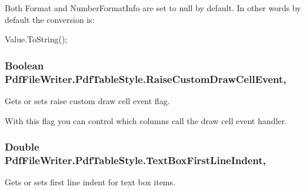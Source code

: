 Both Format and Number\+Format\+Info are set to null by default. In other words by default the conversion is\+: 


\begin{DoxyCode}
Value.ToString();
\end{DoxyCode}
\subsubsection[{\texorpdfstring{Raise\+Custom\+Draw\+Cell\+Event}{RaiseCustomDrawCellEvent}}]{\setlength{\rightskip}{0pt plus 5cm}Boolean Pdf\+File\+Writer.\+Pdf\+Table\+Style.\+Raise\+Custom\+Draw\+Cell\+Event\hspace{0.3cm}{\ttfamily [get]}, {\ttfamily [set]}}\hypertarget{class_pdf_file_writer_1_1_pdf_table_style_a051ae047e5ab3ed7746ad16c4f6525b4}{}\label{class_pdf_file_writer_1_1_pdf_table_style_a051ae047e5ab3ed7746ad16c4f6525b4}


Gets or sets raise custom draw cell event flag. 

With this flag you can control which columns call the draw cell event handler. 
\subsubsection[{\texorpdfstring{Text\+Box\+First\+Line\+Indent}{TextBoxFirstLineIndent}}]{\setlength{\rightskip}{0pt plus 5cm}Double Pdf\+File\+Writer.\+Pdf\+Table\+Style.\+Text\+Box\+First\+Line\+Indent\hspace{0.3cm}{\ttfamily [get]}, {\ttfamily [set]}}\hypertarget{class_pdf_file_writer_1_1_pdf_table_style_a41d2022f46b2c126692097b0b24257b2}{}\label{class_pdf_file_writer_1_1_pdf_table_style_a41d2022f46b2c126692097b0b24257b2}


Gets or sets first line indent for text box items. 

